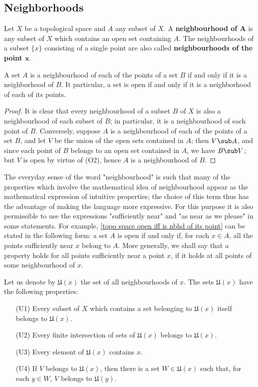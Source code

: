 \subsection{Neighborhoods}
Let $X$ be a topological space and $A$ any subset of $X$. A \textbf{neighbourhood of $\bm{A}$} is any subset of $X$ which contains an open set containing $A$. The neighbourhoods of a subset $\{x\}$ consisting of a single point are also called \textbf{neighbourhoods of the point $\bm{x}$}.\par
\begin{proposition}\label{topo space open iff is nbhd of its point}
A set $A$ is a neighbourhood of each of the points of a set $B$ if and only if it is a neighborhood of $B$. It particular, a set is open if and only if it is a neighborhood of each of its points.
\end{proposition}
\begin{proof}
It is clear that every neighbourhood of a subset $B$ of $X$ is also a neighbourhood of each subset of $B$; in particular, it is a neighbourhood of each point of $B$. Conversely, suppose $A$ is a neighbourhood of each of the points of a set $B$, and let $V$ be the union of the open sets contained in $A$; then $V\sub A$, and since each point of $B$ belongs to an open set contained in $A$, we have $B\sub V$; but $V$ is open by virtue of (O2), hence $A$ is a neighbourhood of $B$.
\end{proof}
\begin{remark}
The everyday sense of the word "neighbourhood" is such that many of the properties which involve the mathematical idea of neighbourhood appear as the mathematical expression of intuitive properties; the choice of this term thus has the advantage of making the language more expressive. For this purpose it is also permissible to use the expressions "sufficiently near" and "as near as we please" in some statements. For example, \cref{topo space open iff is nbhd of its point} can be stated in the following form: a set $A$ is open if and only if, for each $x\in A$, all the points sufficiently near $x$ belong to $A$. More generally, we shall say that a property holds for all points sufficiently near a point $x$, if it holds at all points of some neighbourhood of $x$.
\end{remark}
Let us denote by $\mathfrak{U}(x)$ the set of all neighbourhoods of $x$. The sets $\mathfrak{U}(x)$ have the following properties:
\begin{enumerate}[leftmargin=35pt]
\item[(U1)] Every subset of $X$ which contains a set belonging to $\mathfrak{U}(x)$ itself belongs to $\mathfrak{U}(x)$.
\item[(U2)] Every finite intersection of sets of $\mathfrak{U}(x)$ belongs to $\mathfrak{U}(x)$.
\item[(U3)] Every element of $\mathfrak{U}(x)$ contains $x$.
\item[(U4)] If $V$ belongs to $\mathfrak{U}(x)$, then there is a set $W\in\mathfrak{U}(x)$ such that, for each $y\in W$, $V$ belongs to $\mathfrak{U}(y)$.
\end{enumerate}
